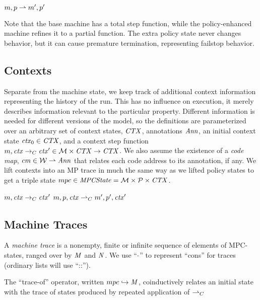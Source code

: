 \documentclass[acmsmall,review,anonymous]{acmart}\settopmatter{printfolios=true,printccs=false,printacmref=false}
\begin{document}
            {\(m,p \overset{}{\rightharpoonup}
               m',p'\)}

\noindent
Note that the base machine has a total step function, while the policy-enhanced machine
refines it to a partial function. The extra policy state never changes behavior,
but it can cause
premature termination, representing failstop behavior.

\subsection{Contexts}

Separate from the machine state, we keep track of additional context
information representing the history of the run. This has no influence on execution, it merely
describes information relevant to the particular property. Different information is needed
for different versions of the model, so the definitions are parameterized
over an arbitrary set of context states, \(\mathit{CTX}\), annotations \(\mathit{Ann}\),
an initial context state \(\mathit{ctx}_0 \in \mathit{CTX}\), and a context step function
\(m, \mathit{ctx} \rightarrow_C \mathit{ctx}' \in {\mathcal M} \times \mathit{CTX}
\rightarrow \mathit{CTX}\). We also assume the existence of a \emph{code map},
\(\mathit{cm} \in {\mathcal W} \rightharpoonup \mathit{Ann}\)
that relates each code address to its annotation, if any.
We lift contexts into an MP trace in much the same way as we lifted policy states to get
a triple state \(mpc \in \mathit{MPCState} = {\mathcal M} \times \mathcal{P} \times
\mathit{CTX}\).

              {\(m, \mathit{ctx} \rightarrow_C \mathit{ctx}'\)}
              {\(m,p,\mathit{ctx} \overset{}{\rightharpoonup}_C
                m',p',\mathit{ctx}'\)}

\subsection{Machine Traces}
\label{sec:traces}

A {\em machine trace} is a nonempty, finite or infinite sequence of elements
of MPC-states, ranged over by \(\mathit{M}\) and \(\mathit{N}\).
We use ``\(\cdot\)'' to represent ``cons'' for traces (ordinary lists will use
``::'').

The ``trace-of'' operator, written \(mpc \hookrightarrow \mathit{M}\),
coinductively relates an initial state with the trace of states
produced by repeated application of \(\overset{}{\rightharpoonup}_C\)
\end{document}
